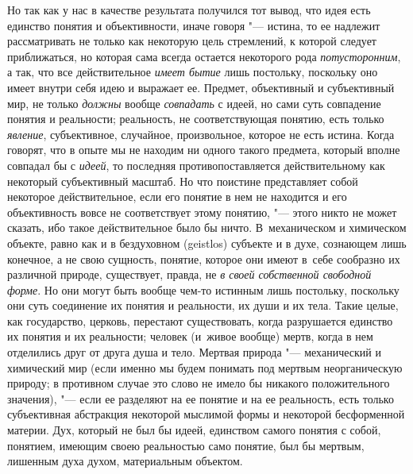 Но так как у нас в качестве результата получился тот вывод,
что идея есть единство понятия и объективности, иначе говоря
"--- истина, то ее надлежит рассматривать не только как
некоторую цель стремлений, к которой следует приближаться, но которая сама
всегда остается некоторого рода
{\em потусторонним}, а
так, что все действительное {\em имеет
бытие} лишь постольку, поскольку оно имеет внутри себя идею
и выражает ее. Предмет, объективный и субъективный мир, не только
{\em должны} вообще
{\em совпадать}
с идеей, но сами суть совпадение понятия и реальности;
реальность, не соответствующая понятию, есть только
{\em явление},
субъективное, случайное, произвольное, которое не есть
истина. Когда говорят, что в опыте мы не находим ни одного такого предмета,
который вполне совпадал бы с
{\em идеей}, то последняя
противопоставляется действительному как некоторый
субъективный масштаб. Но что поистине представляет собой некоторое
действительное, если его понятие в нем не находится и его объективность
вовсе не соответствует этому понятию, "--- этого никто не может
сказать, ибо такое действительное было бы ничто. В~механическом и
химическом объекте, равно как и в бездуховном (geistlos)
субъекте и в духе, сознающем лишь конечное, а не свою
сущность, понятие, которое они имеют в~себе сообразно их различной природе,
существует, правда, не {\em в своей
собственной свободной форме}. Но они могут быть вообще
чем-то истинным лишь постольку, поскольку они суть соединение их понятия и
реальности, их души и их тела. Такие целые, как государство, церковь,
перестают существовать, когда разрушается единство их понятия и их
реальности; человек (и~живое вообще) мертв, когда в нем отделились друг от
друга душа и тело. Мертвая природа "--- механический и
химический мир (если именно мы будем понимать под мертвым неорганическую
природу; в противном случае это слово не имело бы никакого положительного
значения), "--- если ее разделяют на ее понятие и на ее
реальность, есть только субъективная абстракция некоторой мыслимой формы и
некоторой бесформенной материи. Дух, который не был бы идеей, единством
самого понятия с собой, понятием, имеющим своею реальностью само понятие,
был бы мертвым, лишенным духа духом, материальным объектом.

